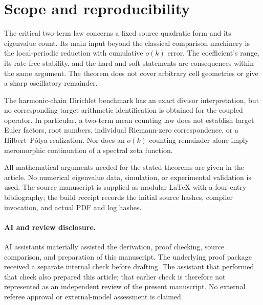 \section{Scope and reproducibility}
\label{sec:scope}

The critical two-term law concerns a fixed source quadratic
form and its eigenvalue count. Its main input beyond the
classical comparison machinery is the local-periodic
reduction with cumulative $o(k)$ error. The coefficient's
range, its rate-free stability, and the hard and soft
statements are consequences within the same argument.
The theorem does not cover arbitrary cell geometries or
give a sharp oscillatory remainder.

The harmonic-chain Dirichlet benchmark has an exact
divisor interpretation, but no corresponding target
arithmetic identification is obtained for the coupled
operator. In particular, a two-term mean counting law
does not establish target Euler factors, root numbers,
individual Riemann-zero correspondence, or a
Hilbert--P\'olya realization. Nor does an $o(k)$ counting
remainder alone imply meromorphic continuation of a
spectral zeta function.

All mathematical arguments needed for the stated theorems
are given in the article. No numerical eigenvalue data,
simulation, or experimental validation is used. The
source manuscript is supplied as modular \LaTeX{} with
a four-entry bibliography; the build receipt records
the initial source hashes, compiler invocation, and
actual PDF and log hashes.

\paragraph{AI and review disclosure.}
AI assistants materially assisted the derivation, proof
checking, source comparison, and preparation of this
manuscript. The underlying proof package received a
separate internal check before drafting. The assistant
that performed that check also prepared this article;
that earlier check is therefore not represented as an
independent review of the present manuscript. No external
referee approval or external-model assessment is claimed.
